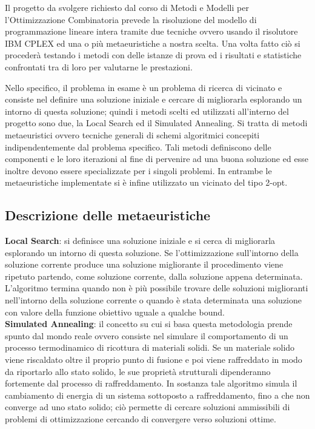 \documentclass[preprint,12pt]{elsarticle}
\begin{document}
Il progetto da svolgere richiesto dal corso di Metodi e Modelli per l'Ottimizzazione Combinatoria prevede la risoluzione del modello di programmazione lineare intera tramite due tecniche ovvero usando il risolutore IBM CPLEX ed una o più metaeuristiche a nostra scelta. Una volta fatto ciò si procederà testando i metodi con delle istanze di prova ed i risultati e statistiche confrontati tra di loro per valutarne le prestazioni.

Nello specifico, il problema in esame è un problema di ricerca di vicinato e consiste nel definire una soluzione iniziale e cercare di migliorarla esplorando un intorno di questa soluzione; quindi i metodi scelti ed utilizzati all'interno del progetto sono due, la Local Search ed il Simulated Annealing. Si tratta di metodi metaeuristici ovvero tecniche generali di schemi algoritmici concepiti indipendentemente dal problema specifico. Tali metodi definiscono delle componenti e le loro iterazioni al fine di pervenire ad una buona soluzione ed esse inoltre devono essere specializzate per i singoli problemi. In entrambe le metaeuristiche implementate si è infine utilizzato un vicinato del tipo 2-opt.\\

\subsection{\textbf{Descrizione delle metaeuristiche}}


\textbf{Local Search}: si definisce una soluzione iniziale e si cerca di migliorarla esplorando un intorno di questa soluzione. Se l'ottimizzazione sull'intorno della soluzione corrente produce una soluzione migliorante il procedimento viene ripetuto partendo, come soluzione corrente, dalla soluzione appena determinata. L'algoritmo termina quando non è più possibile trovare delle soluzioni miglioranti nell'intorno della soluzione corrente o quando è stata determinata una soluzione con valore della funzione obiettivo uguale a qualche bound.\\

\textbf{Simulated Annealing}: il concetto su cui si basa questa metodologia prende spunto dal mondo reale ovvero consiste nel simulare il comportamento di un processo termodinamico di ricottura di materiali solidi. Se un materiale solido viene riscaldato oltre il proprio punto di fusione e poi viene raffreddato in modo da riportarlo allo stato solido, le sue proprietà strutturali dipenderanno fortemente dal processo di raffreddamento. In sostanza tale algoritmo simula il cambiamento di energia di un sistema sottoposto a raffreddamento, fino a che non converge ad uno stato solido; ciò permette di cercare soluzioni ammissibili di problemi di ottimizzazione cercando di convergere verso soluzioni ottime. \\
\end{document}
